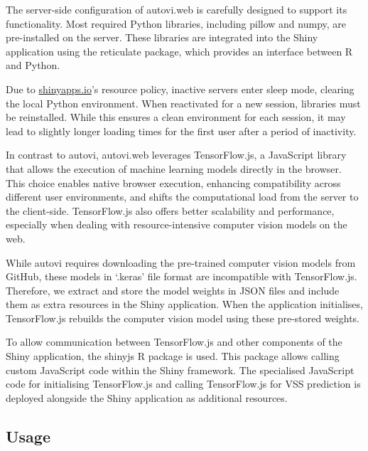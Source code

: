 \documentclass[
doublespace,
  times]{anzsauth}
\begin{document}
The server-side configuration of \textsf{autovi.web} is carefully
designed to support its functionality. Most required \textsf{Python}
libraries, including \textsf{pillow} and \textsf{numpy}, are
pre-installed on the server. These libraries are integrated into the
\textsf{Shiny} application using the \textsf{reticulate} package, which
provides an interface between \textsf{R} and \textsf{Python}.

Due to \href{https://www.shinyapps.io}{shinyapps.io}'s resource policy,
inactive servers enter sleep mode, clearing the local \textsf{Python}
environment. When reactivated for a new session, libraries must be
reinstalled. While this ensures a clean environment for each session, it
may lead to slightly longer loading times for the first user after a
period of inactivity.

In contrast to \textsf{autovi}, \textsf{autovi.web} leverages
\textsf{TensorFlow.js}, a \textsf{JavaScript} library that allows the
execution of machine learning models directly in the browser. This
choice enables native browser execution, enhancing compatibility across
different user environments, and shifts the computational load from the
server to the client-side. \textsf{TensorFlow.js} also offers better
scalability and performance, especially when dealing with
resource-intensive computer vision models on the web.

While \textsf{autovi} requires downloading the pre-trained computer
vision models from GitHub, these models in `.keras' file format are
incompatible with \textsf{TensorFlow.js}. Therefore, we extract and
store the model weights in JSON files and include them as extra
resources in the \textsf{Shiny} application. When the application
initialises, \textsf{TensorFlow.js} rebuilds the computer vision model
using these pre-stored weights.

To allow communication between \textsf{TensorFlow.js} and other
components of the \textsf{Shiny} application, the \textsf{shinyjs}
\textsf{R} package \citep{shinyjs} is used. This package allows calling
custom \textsf{JavaScript} code within the \textsf{Shiny} framework. The
specialised \textsf{JavaScript} code for initialising
\textsf{TensorFlow.js} and calling \textsf{TensorFlow.js} for VSS
prediction is deployed alongside the \textsf{Shiny} application as
additional resources.

\subsection{Usage}\label{sec-autovi-web-workflow}
\end{document}
